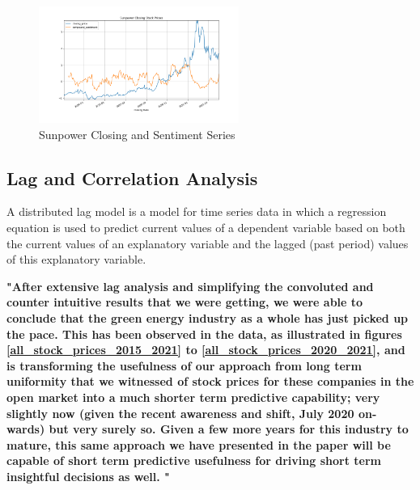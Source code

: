 \documentclass[sigconf, nonacm]{acmart}
\begin{document}
\begin{figure}[H]
  \centering
  \includegraphics[width=\linewidth, height =1.5in]{sentiment_time_series/Sunpower Closing Stock Prices_closing_price_compound_sentiment.png}
  \caption{Sunpower Closing and Sentiment Series}
  \label{Sunpower Closing Stock Prices_closing_price_compound_sentiment}
\end{figure}

\subsection{Lag and Correlation Analysis} 
A distributed lag model is a model for time series data in which a regression equation is used to predict current values of a dependent variable based on both the current values of an explanatory variable and the lagged (past period) values of this explanatory variable.

\textbf{"After extensive lag analysis and simplifying the convoluted and counter intuitive results that we were getting, we were able to conclude that the green energy industry as a whole has just picked up the pace. This has been observed in the data, as illustrated in figures \ref{all_stock_prices_2015_2021} to \ref{all_stock_prices_2020_2021},  and is transforming the usefulness of our approach from long term uniformity that we witnessed of stock prices for these companies in the open market into a much shorter term predictive capability; very slightly now (given the recent awareness and shift, July 2020 on-wards) but very surely so. Given a few more years for this industry to mature, this same approach we have presented in the paper will be capable of short term predictive usefulness for driving short term insightful decisions as well. "}
\end{document}
